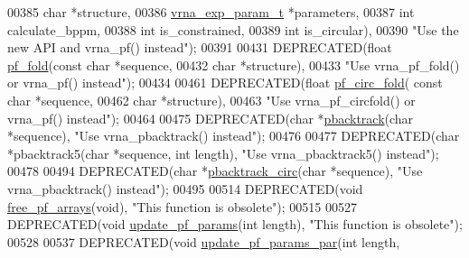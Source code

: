\begin{DoxyCode}
00385                       \textcolor{keywordtype}{char} *structure,
00386                       \hyperlink{group__energy__parameters_structvrna__exp__param__s}{vrna\_exp\_param\_t} *parameters,
00387                       \textcolor{keywordtype}{int} calculate\_bppm,
00388                       \textcolor{keywordtype}{int} is\_constrained,
00389                       \textcolor{keywordtype}{int} is\_circular),
00390 \textcolor{stringliteral}{"Use the new API and vrna\_pf() instead"});
00391 
00431 DEPRECATED(\textcolor{keywordtype}{float}   \hyperlink{group__part__func__global__deprecated_gadc3db3d98742427e7001a7fd36ef28c2}{pf\_fold}(\textcolor{keyword}{const} \textcolor{keywordtype}{char} *sequence,
00432                 \textcolor{keywordtype}{char} *structure),
00433 \textcolor{stringliteral}{"Use vrna\_pf\_fold() or vrna\_pf() instead"});
00434 
00461 DEPRECATED(\textcolor{keywordtype}{float}   \hyperlink{group__part__func__global__deprecated_ga819ce5fca8984004ac81c4a3b04cb735}{pf\_circ\_fold}( \textcolor{keyword}{const} \textcolor{keywordtype}{char} *sequence,
00462                       \textcolor{keywordtype}{char} *structure),
00463 \textcolor{stringliteral}{"Use vrna\_pf\_circfold() or vrna\_pf() instead"});
00464 
00475 DEPRECATED(\textcolor{keywordtype}{char}    *\hyperlink{group__subopt__stochbt_gac03ca6db186bb3bf0a2a326d7fb3ba03}{pbacktrack}(\textcolor{keywordtype}{char} *sequence), \textcolor{stringliteral}{"Use vrna\_pbacktrack() instead"});
00476 
00477 DEPRECATED(\textcolor{keywordtype}{char}    *pbacktrack5(\textcolor{keywordtype}{char} *sequence, \textcolor{keywordtype}{int} length), \textcolor{stringliteral}{"Use vrna\_pbacktrack5() instead"});
00478 
00494 DEPRECATED(\textcolor{keywordtype}{char}    *\hyperlink{group__subopt__stochbt_ga00474051204ac9ad576b3e45174d03ff}{pbacktrack\_circ}(\textcolor{keywordtype}{char} *sequence), \textcolor{stringliteral}{"Use vrna\_pbacktrack() instead"});
00495 
00514 DEPRECATED(\textcolor{keywordtype}{void}  \hyperlink{group__part__func__global__deprecated_gae73db3f49a94f0f72e067ecd12681dbd}{free\_pf\_arrays}(\textcolor{keywordtype}{void}), \textcolor{stringliteral}{"This function is obsolete"});
00515 
00527 DEPRECATED(\textcolor{keywordtype}{void}  \hyperlink{group__part__func__global__deprecated_ga384e927890f9c034ff09fa66da102d28}{update\_pf\_params}(\textcolor{keywordtype}{int} length), \textcolor{stringliteral}{"This function is obsolete"});
00528 
00537 DEPRECATED(\textcolor{keywordtype}{void} \hyperlink{group__part__func__global__deprecated_gaafe2d1b21f5418b123b088aa395e827d}{update\_pf\_params\_par}(\textcolor{keywordtype}{int} length, 

\end{DoxyCode}
